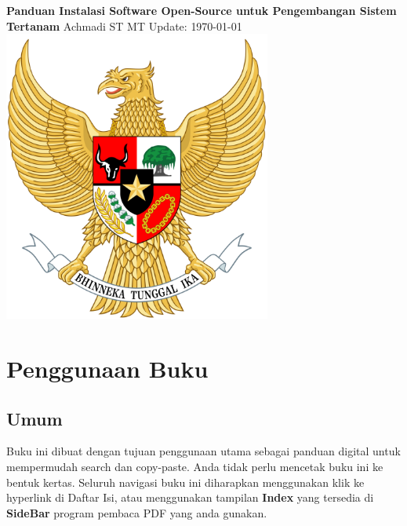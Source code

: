 \documentclass[12pt]{book}
\date{}
\begin{document}
	\frontmatter
	\begin{titlepage}
		\centering
		{\LARGE \bf Panduan Instalasi Software Open-Source untuk Pengembangan Sistem Tertanam}
		\vfill
		{\Large Achmadi ST MT}
		\vfill
		Update: {\today}
		\vfill
		\includegraphics[width=250pt]{images/pancasila}
		\vfill
		\vfill
		\vfill
	\end{titlepage}
	
	
	\newpage
	\tableofcontents
	\listoffigures
	\listoftables
	
	
	
	\newpage
	\chapter{Penggunaan Buku}
	
	\section{Umum}
	Buku ini dibuat dengan tujuan penggunaan utama sebagai panduan digital untuk mempermudah search dan copy-paste.
	Anda tidak perlu mencetak buku ini ke bentuk kertas.
	Seluruh navigasi buku ini diharapkan menggunakan klik ke hyperlink di Daftar Isi,
	atau menggunakan tampilan \textbf{Index} yang tersedia di \textbf{SideBar} program pembaca PDF yang anda gunakan.
	
\end{document}
